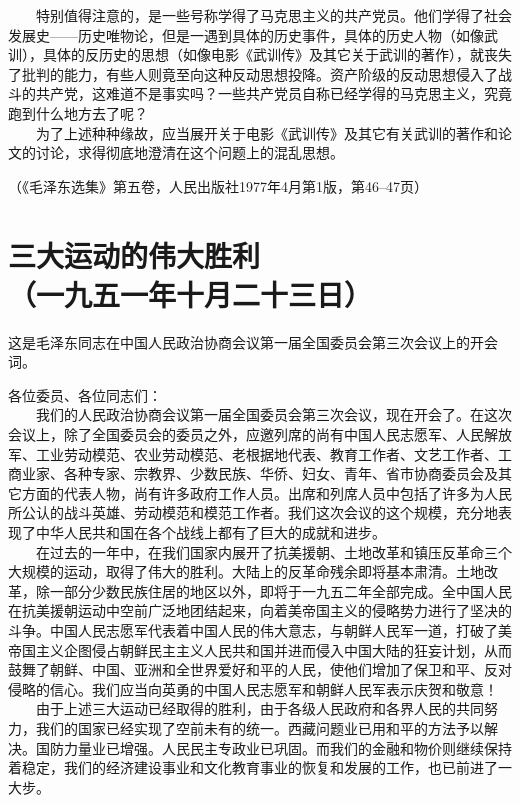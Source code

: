 \documentclass[cn,11pt,chinese]{elegantbook}
\def\myformat#1{\hfil\hfil #1}
\begin{document}
　　特别值得注意的，是一些号称学得了马克思主义的共产党员。他们学得了社会发展史——历史唯物论，但是一遇到具体的历史事件，具体的历史人物（如像武训），具体的反历史的思想（如像电影《武训传》及其它关于武训的著作），就丧失了批判的能力，有些人则竟至向这种反动思想投降。资产阶级的反动思想侵入了战斗的共产党，这难道不是事实吗？一些共产党员自称已经学得的马克思主义，究竟跑到什么地方去了呢？\\
　　为了上述种种缘故，应当展开关于电影《武训传》及其它有关武训的著作和论文的讨论，求得彻底地澄清在这个问题上的混乱思想。\\
\begin{flushright}（《毛泽东选集》第五卷，人民出版社1977年4月第1版，第46--47页）\end{flushright}
\newpage\section*{\myformat{三大运动的伟大胜利}\\\myformat{（一九五一年十月二十三日）}}
\begin{introduction}\item  这是毛泽东同志在中国人民政治协商会议第一届全国委员会第三次会议上的开会词。\end{introduction}
各位委员、各位同志们：\\
　　我们的人民政治协商会议第一届全国委员会第三次会议，现在开会了。在这次会议上，除了全国委员会的委员之外，应邀列席的尚有中国人民志愿军、人民解放军、工业劳动模范、农业劳动模范、老根据地代表、教育工作者、文艺工作者、工商业家、各种专家、宗教界、少数民族、华侨、妇女、青年、省市协商委员会及其它方面的代表人物，尚有许多政府工作人员。出席和列席人员中包括了许多为人民所公认的战斗英雄、劳动模范和模范工作者。我们这次会议的这个规模，充分地表现了中华人民共和国在各个战线上都有了巨大的成就和进步。\\
　　在过去的一年中，在我们国家内展开了抗美援朝、土地改革和镇压反革命三个大规模的运动，取得了伟大的胜利。大陆上的反革命残余即将基本肃清。土地改革，除一部分少数民族住居的地区以外，即将于一九五二年全部完成。全中国人民在抗美援朝运动中空前广泛地团结起来，向着美帝国主义的侵略势力进行了坚决的斗争。中国人民志愿军代表着中国人民的伟大意志，与朝鲜人民军一道，打破了美帝国主义企图侵占朝鲜民主主义人民共和国并进而侵入中国大陆的狂妄计划，从而鼓舞了朝鲜、中国、亚洲和全世界爱好和平的人民，使他们增加了保卫和平、反对侵略的信心。我们应当向英勇的中国人民志愿军和朝鲜人民军表示庆贺和敬意！\\
　　由于上述三大运动已经取得的胜利，由于各级人民政府和各界人民的共同努力，我们的国家已经实现了空前未有的统一。西藏问题业已用和平的方法予以解决。国防力量业已增强。人民民主专政业已巩固。而我们的金融和物价则继续保持着稳定，我们的经济建设事业和文化教育事业的恢复和发展的工作，也已前进了一大步。\\
\end{document}
